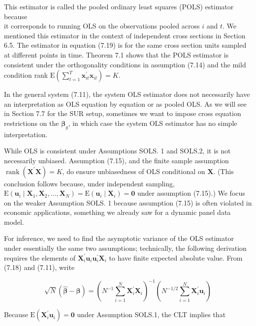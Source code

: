 \documentclass[10pt]{article}
\begin{document}
This estimator is called the pooled ordinary least squares (POLS) estimator because\\
it corresponds to running OLS on the observations pooled across $i$ and $t$. We mentioned this estimator in the context of independent cross sections in Section 6.5. The estimator in equation (7.19) is for the same cross section units sampled at different points in time. Theorem 7.1 shows that the POLS estimator is consistent under the orthogonality conditions in assumption (7.14) and the mild condition rank $\mathrm{E}\left(\sum_{t=1}^{T} \mathbf{x}_{i t}^{\prime} \mathbf{x}_{i t}\right)=K$.

In the general system (7.11), the system OLS estimator does not necessarily have an interpretation as OLS equation by equation or as pooled OLS. As we will see in Section 7.7 for the SUR setup, sometimes we want to impose cross equation restrictions on the $\boldsymbol{\beta}_{g}$, in which case the system OLS estimator has no simple interpretation.

While OLS is consistent under Assumptions SOLS. 1 and SOLS.2, it is not necessarily unbiased. Assumption (7.15), and the finite sample assumption $\operatorname{rank}\left(\mathbf{X}^{\prime} \mathbf{X}\right)= K$, do ensure unbiasedness of OLS conditional on $\mathbf{X}$. (This conclusion follows because, under independent sampling, $\mathrm{E}\left(\mathbf{u}_{i} \mid \mathbf{X}_{1}, \mathbf{X}_{2}, \ldots, \mathbf{X}_{N}\right)=\mathrm{E}\left(\mathbf{u}_{i} \mid \mathbf{X}_{i}\right)=\mathbf{0}$ under assumption (7.15).) We focus on the weaker Assumption SOLS. 1 because assumption (7.15) is often violated in economic applications, something we already saw for a dynamic panel data model.

For inference, we need to find the asymptotic variance of the OLS estimator under essentially the same two assumptions; technically, the following derivation requires the elements of $\mathbf{X}_{i}^{\prime} \mathbf{u}_{i} \mathbf{u}_{i}^{\prime} \mathbf{X}_{i}$ to have finite expected absolute value. From (7.18) and (7.11), write

$$
\sqrt{N}(\hat{\boldsymbol{\beta}}-\boldsymbol{\beta})=\left(N^{-1} \sum_{i=1}^{N} \mathbf{X}_{i}^{\prime} \mathbf{X}_{i}\right)^{-1}\left(N^{-1 / 2} \sum_{i=1}^{N} \mathbf{X}_{i}^{\prime} \mathbf{u}_{i}\right)
$$

Because $\mathrm{E}\left(\mathbf{X}_{i}^{\prime} \mathbf{u}_{i}\right)=\mathbf{0}$ under Assumption SOLS.1, the CLT implies that
\end{document}
